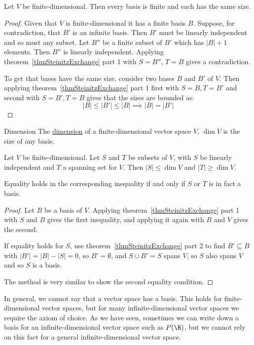 \documentclass[../Main.tex]{subfiles}
\begin{document}
\begin{corollary}
    Let $V$ be finite-dimensional. Then every basis is finite and each has the same size.
    \label{corBasesSameSize}
\end{corollary}
\begin{proof}
    Given that $V$ is finite-dimensional it has a finite basis $B$. Suppose, for contradiction, that $B'$ is an infinite basis. Then $B'$ must be linearly independent and so must any subset. Let $B''$ be a finite subset of $B'$ which has $|B| + 1$ elements. Then $B''$ is linearly independent. Applying theorem~\ref{thmSteinitzExchange} part 1 with $S = B''$, $T = B$ gives a contradiction.

    To get that bases have the same size, consider two bases $B$ and $B'$ of $V$. Then applying theorem~\ref{thmSteinitzExchange} part 1 first with $S = B, T = B'$ and second with $S = B', T = B$ gives that the sizes are bounded as:
    \begin{equation*}
        |B| \leq |B'| \leq |B| \implies |B| = |B'|
    \end{equation*}
\end{proof}
\begin{definition}{Dimension}
    The \underline{dimension} of a finite-dimensional vector space $V$, $\dim{V}$ is the size of any basis.
\end{definition}
\begin{corollary}
    Let $V$ be finite-dimensional. Let $S$ and $T$ be subsets of $V$, with $S$ be linearly independent and $T$ a spanning set for $V$. Then $|S| \leq \dim{V}$ and $|T| \geq \dim{V}$.

    Equality holds in the corresponding inequality if and only if $S$ or $T$ is in fact a basis.
    \label{corSpanLISizes}
\end{corollary}
\begin{proof}
    Let $B$ be a basis of $V$. Applying theorem~\ref{thmSteinitzExchange} part 1 with $S$ and $B$ gives the first inequality, and applying it again with $B$ and $V$ gives the second.

    If equality holds for $S$, use theorem~\ref{thmSteinitzExchange} part 2 to find $B' \subseteq B$ with $|B'| = |B| - |S| = 0$, so $B' = \emptyset$, and $S \cup B' = S$ spans $V$, so $S$ also spans $V$ and so $S$ is a basis.

    The method is very similar to show the second equality condition.
\end{proof}
\begin{remark}
    In general, we cannot say that a vector space has a basis. This holds for finite-dimensional vector spaces, but for many infinite-dimensional vector spaces we require the axiom of choice. As we have seen, sometimes we can write down a basis for an infinite-dimensional vector space such as $P(\R)$, but we cannot rely on this fact for a general infinite-dimensional vector space.
\end{remark}
\end{document}
